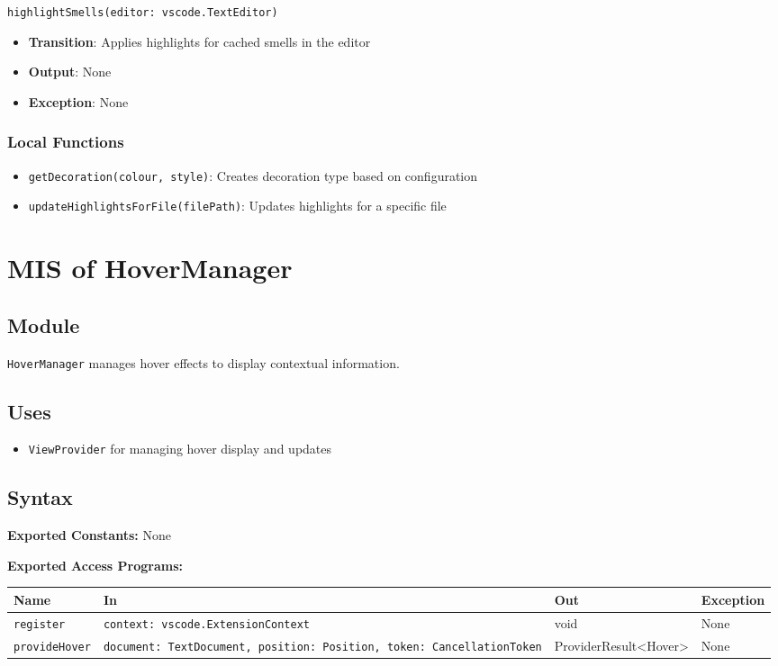 \documentclass[12pt, titlepage]{article}
\begin{document}
\texttt{highlightSmells(editor: vscode.TextEditor)}
\begin{itemize}
\item \textbf{Transition}: Applies highlights for cached smells in the editor
\item \textbf{Output}: None
\item \textbf{Exception}: None
\end{itemize}

\subsubsection{Local Functions}
\begin{itemize}
\item \texttt{getDecoration(colour, style)}: Creates decoration type based on configuration
\item \texttt{updateHighlightsForFile(filePath)}: Updates highlights for a specific file
\end{itemize}

\section{MIS of HoverManager}

\subsection{Module}
\texttt{HoverManager} manages hover effects to display contextual information.

\subsection{Uses}
\begin{itemize}
\item \texttt{ViewProvider} for managing hover display and updates
\end{itemize}

\subsection{Syntax}

\textbf{Exported Constants:} None

\textbf{Exported Access Programs:}\\
\begin{tabularx}{\linewidth}{|l|>{\raggedright\arraybackslash}X|l|l|}
  \hline
  \textbf{Name} & \textbf{In} & \textbf{Out} & \textbf{Exception} \\
  \hline
  \texttt{register} & \texttt{context: vscode.ExtensionContext} & void & None \\ \hline
  \texttt{provideHover} & \texttt{document: TextDocument, position: Position, token: CancellationToken} & ProviderResult<Hover> & None \\
  \hline
\end{tabularx}
\end{document}
